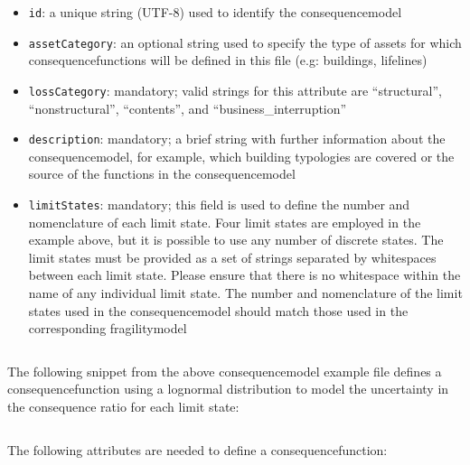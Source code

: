 \begin{itemize}

    \item \Verb+id+: a unique string (UTF-8) used to identify the
    \gls{consequencemodel}

    \item \Verb+assetCategory+: an optional string used to specify the type of
    \glspl{asset} for which \glspl{consequencefunction} will be defined in this 
    file (e.g: buildings, lifelines)

    \item \Verb+lossCategory+: mandatory; valid strings for this attribute are 
    ``structural'', ``nonstructural'', ``contents'', and 
    ``business\_interruption''

    \item \Verb+description+: mandatory; a brief string with further 
    information about the \gls{consequencemodel}, for example, which building
    typologies are covered or the source of the functions in the
    \gls{consequencemodel}

    \item \Verb+limitStates+: mandatory; this field is used to define the number and 
    nomenclature of each limit state. Four limit states are employed in the 
    example above, but it is possible to use any number of discrete states. The 
    limit states must be provided as a set of strings separated by whitespaces 
    between each limit state. Please ensure that there is no whitespace within 
    the name of any individual limit state. The number and nomenclature of the
    limit states used in the \gls{consequencemodel} should match those used in
    the corresponding \gls{fragilitymodel}

\end{itemize}

\inputminted[firstline=4,firstnumber=4,lastline=9,fontsize=\footnotesize,frame=single,linenos,bgcolor=lightgray]{xml}{oqum/risk/Verbatim/input_consequence.xml}

The following snippet from the above \gls{consequencemodel} example file defines a
\gls{consequencefunction} using a lognormal distribution to model the uncertainty
in the consequence ratio for each limit state:

\inputminted[firstline=11,firstnumber=11,lastline=16,fontsize=\footnotesize,frame=single,linenos,bgcolor=lightgray]{xml}{oqum/risk/Verbatim/input_consequence.xml}

The following attributes are needed to define a \gls{consequencefunction}:

